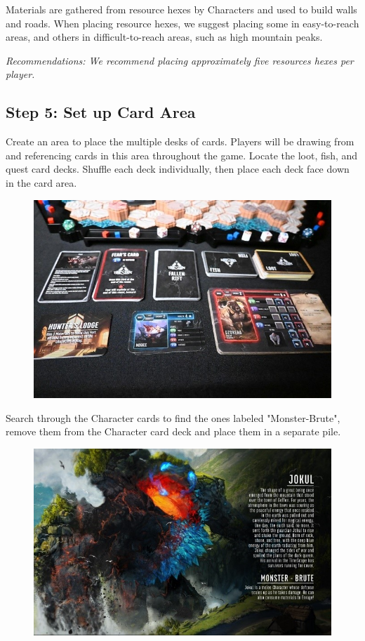 \documentclass[../main.tex]{subfiles}
\begin{document}
Materials are gathered from resource hexes by Characters and used to build walls and roads. When placing resource hexes, we suggest placing some in easy-to-reach areas, and others in difficult-to-reach areas, such as high mountain peaks. 

\textit{Recommendations: We recommend placing approximately five resources hexes per player. }

\subsection{Step 5:  Set up Card Area}
Create an area to place the multiple desks of cards. Players will be drawing from and referencing cards in this area throughout the game. Locate the loot, fish, and quest card decks. Shuffle each deck individually, then place each deck face down in the card area. 

\begin{figure}[h]
    \centering
    \includegraphics[width=1\linewidth]{chapters//boardsetup/TimeStrikeCardPlacement.jpg}
\end{figure}

Search through the Character cards to find the ones labeled "Monster-Brute", remove them from the Character card deck and place them in a separate pile.

\begin{figure}[h]
    \centering
    \includegraphics[width=1\linewidth]{chapters//boardsetup/TimeStrikeCharacterCardMonster.jpg}   
\end{figure}
\end{document}

